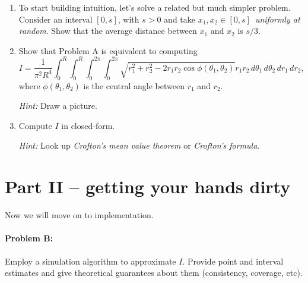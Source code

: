 \documentclass[a4paper,10pt, notitlepage]{report}
\begin{document}
\begin{enumerate}
 \item To start building intuition, let's solve a related but much simpler problem.
 Consider an interval $[0, s]$, with $s>0$ and take $x_1,x_2 \in [0, s]$~\textit{uniformly at random}.
 Show that the average distance between $x_1$ and $x_2$ is $s/3$.
 \item Show that Problem A is equivalent to computing
 \begin{equation*}
  I = \frac{1}{\pi^2 R^4}\int_{0}^{R}\int_{0}^{R}\int_{0}^{2\pi}\int_{0}^{2\pi}\sqrt{r_1^2 + r_2^2 - 2r_1r_2\cos\phi(\theta_1, \theta_2)}r_1r_2\,d\theta_1\,d\theta_2\,dr_1\,dr_2,
 \end{equation*}
 where $\phi(\theta_1, \theta_2)$ is the central angle between $r_1$ and $r_2$.
 
 \textit{Hint:} Draw a picture.
 \item Compute $I$ in closed-form.

 \textit{Hint:} Look up \textit{Crofton's mean value theorem} or \textit{Crofton's formula}. 
\end{enumerate}

\section*{Part II -- getting your hands dirty}

Now we will move on to implementation.

\paragraph{Problem B:} Employ a simulation algorithm to approximate $I$.
Provide point and interval estimates and give theoretical guarantees about them (consistency, coverage, etc).
\end{document}
